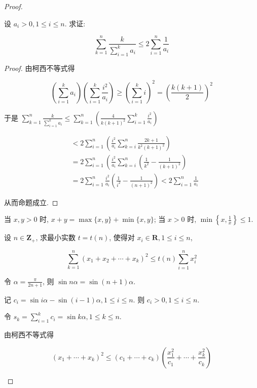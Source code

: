 \begin{proof}
\begin{example}
\begin{solution}
\begin{note}
\begin{solution}
\begin{example}
	设 $a_{i}>0,1 \leqslant i \leqslant n$. 求证:
	
	$$
	\sum_{k=1}^{n} \frac{k}{\sum_{i=1}^{k} a_{i}} \leqslant 2 \sum_{i=1}^{n} \frac{1}{a_{i}}
	$$
\end{example}
\begin{proof}
	由柯西不等式得
	
	$$
	\left(\sum_{i=1}^{k} a_{i}\right)\left(\sum_{i=1}^{k} \frac{i^{2}}{a_{i}}\right) \geqslant\left(\sum_{i=1}^{k} i\right)^{2}=\left(\frac{k(k+1)}{2}\right)^{2}
	$$
	
	于是 $\sum_{k=1}^{n} \frac{k}{\sum_{i=1}^{k} a_{i}} \leqslant \sum_{k=1}^{n}\left(\frac{4}{k(k+1)^{2}} \sum_{i=1}^{k} \frac{i^{2}}{a_{i}}\right)$
	
	$$
	\begin{aligned}
	& <2 \sum_{i=1}^{n}\left(\frac{i^{2}}{a_{i}} \sum_{k=i}^{n} \frac{2 k+1}{k^{2}(k+1)^{2}}\right) \\
	& =2 \sum_{i=1}^{n}\left(\frac{i^{2}}{a_{i}} \sum_{k=i}^{n}\left(\frac{1}{k^{2}}-\frac{1}{(k+1)^{2}}\right)\right. \\
	& =2 \sum_{i=1}^{n} \frac{i^{2}}{a_{i}}\left(\frac{1}{i^{2}}-\frac{1}{(n+1)^{2}}\right)<2 \sum_{i=1}^{n} \frac{1}{a_{i}}
	\end{aligned}
	$$
	
	从而命题成立.
\end{proof}
\begin{note}
	当 $x, y>0$ 时, $x+y=\max \{x, y\}+\min \{x, y\}$; 当 $x>0$ 时, $\min \left\{x, \frac{1}{x}\right\} \leqslant 1$.
\end{note}

\begin{example}
	设 $n \in \mathbf{Z}_{+}$, 求最小实数 $t=t(n)$, 使得对 $x_{i} \in \mathbf{R}, 1 \leqslant i \leqslant n$,
	
	$$
	\sum_{k=1}^{n}\left(x_{1}+x_{2}+\cdots+x_{k}\right)^{2} \leqslant t(n) \sum_{i=1}^{n} x_{i}^{2}
	$$
\end{example}
\begin{solution}
	令 $\alpha=\frac{\pi}{2 n+1}$, 则 $\sin n \alpha=\sin (n+1) \alpha$.
	
	记 $c_{i}=\sin i \alpha-\sin (i-1) \alpha, 1 \leqslant i \leqslant n$. 则 $c_{i}>0,1 \leqslant i \leqslant n$.
	
	令 $s_{k}=\sum_{i=1}^{k} c_{i}=\sin k \alpha, 1 \leqslant k \leqslant n$.
	
	由柯西不等式得
	
	$$
	\left(x_{1}+\cdots+x_{k}\right)^{2} \leqslant\left(c_{1}+\cdots+c_{k}\right)\left(\frac{x_{1}^{2}}{c_{1}}+\cdots+\frac{x_{k}^{2}}{c_{k}}\right)
	$$
	

\end{solution}
\end{solution}
\end{note}
\end{solution}
\end{example}
\end{proof}
